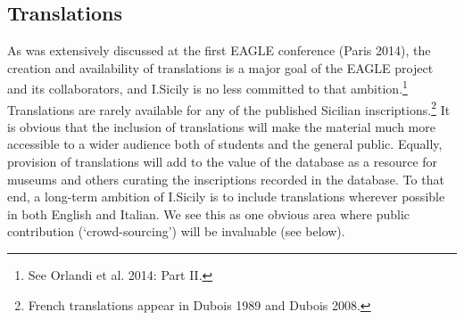 \documentclass[amsthm,ebook]{saparticle}
\begin{document}
\subsection{Translations}


\noindent As was extensively discussed at the first EAGLE conference (Paris 2014), the creation and availability of translations
is a major goal of the EAGLE project and its collaborators, and I.Sicily is no less committed to that
ambition.\footnote{ See Orlandi et al. 2014: Part II.} Translations are rarely available for any of the published
Sicilian inscriptions.\footnote{ French translations appear in Dubois 1989 and Dubois 2008.} It is obvious that the
inclusion of translations will make the material much more accessible to a wider audience both of students and the
general public. Equally, provision of translations will add to the value of the database as a resource for museums and
others curating the inscriptions recorded in the database. To that end, a long-term ambition of I.Sicily is to include
translations wherever possible in both English and Italian. We see this as one obvious area where public contribution
(`crowd-sourcing') will be invaluable (see below).
\end{document}

